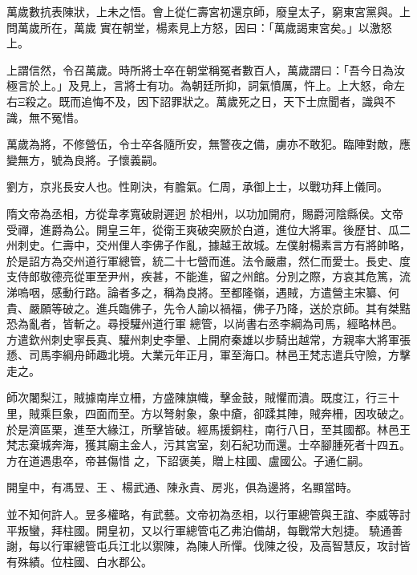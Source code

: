 \begin{pinyinscope}
 萬歲數抗表陳狀，上未之悟。會上從仁壽宮初還京師，廢皇太子，窮東宮黨與。上問萬歲所在，萬歲
 實在朝堂，楊素見上方怒，因曰：「萬歲謁東宮矣。」以激怒上。



 上謂信然，令召萬歲。時所將士卒在朝堂稱冤者數百人，萬歲謂曰：「吾今日為汝極言於上。」及見上，言將士有功。為朝廷所抑，詞氣憤厲，忤上。上大怒，命左右Ξ殺之。既而追悔不及，因下詔罪狀之。萬歲死之日，天下士庶聞者，識與不識，無不冤惜。



 萬歲為將，不修營伍，令士卒各隨所安，無警夜之備，虜亦不敢犯。臨陣對敵，應變無方，號為良將。子懷義嗣。



 劉方，京兆長安人也。性剛決，有膽氣。仁周，承御上士，以戰功拜上儀同。



 隋文帝為丞相，方從韋孝寬破尉遲迥
 於相州，以功加開府，賜爵河陰縣侯。文帝受禪，進爵為公。開皇三年，從衛王爽破突厥於白道，進位大將軍。後歷甘、瓜二州刺史。仁壽中，交州俚人李佛子作亂，據越王故城。左僕射楊素言方有將帥略，於是詔方為交州道行軍總管，統二十七營而進。法令嚴肅，然仁而愛士。長史、度支侍郎敬德亮從軍至尹州，疾甚，不能進，留之州館。分別之際，方哀其危篤，流涕嗚咽，感動行路。論者多之，稱為良將。至都隆嶺，遇賊，方遣營主宋纂、何貴、嚴願等破之。進兵臨佛子，先令人諭以禍福，佛子乃降，送於京師。其有桀黠恐為亂者，皆斬之。尋授驩州道行軍
 總管，以尚書右丞李綱為司馬，經略林邑。方遣欽州刺史寧長真、驩州刺史李暈、上開府秦雄以步騎出越常，方親率大將軍張愻、司馬李綱舟師趣北境。大業元年正月，軍至海口。林邑王梵志遣兵守險，方擊走之。



 師次闍梨江，賊據南岸立柵，方盛陳旗幟，擊金鼓，賊懼而潰。既度江，行三十里，賊乘巨象，四面而至。方以弩射象，象中瘡，卻蹂其陣，賊奔柵，因攻破之。於是濟區栗，進至大緣江，所擊皆破。經馬援銅柱，南行八日，至其國都。林邑王梵志棄城奔海，獲其廟主金人，污其宮室，刻石紀功而還。士卒腳腫死者十四五。方在道遇患卒，帝甚傷惜
 之，下詔褒美，贈上柱國、盧國公。子通仁嗣。



 開皇中，有馮昱、王、楊武通、陳永貴、房兆，俱為邊將，名顯當時。



 並不知何許人。昱多權略，有武藝。文帝初為丞相，以行軍總管與王誼、李威等討平叛蠻，拜柱國。開皇初，又以行軍總管屯乙弗泊備胡，每戰常大剋捷。驍通善謝，每以行軍總管屯兵江北以禦陳，為陳人所憚。伐陳之役，及高智慧反，攻討皆有殊績。位柱國、白水郡公。




\end{pinyinscope}
